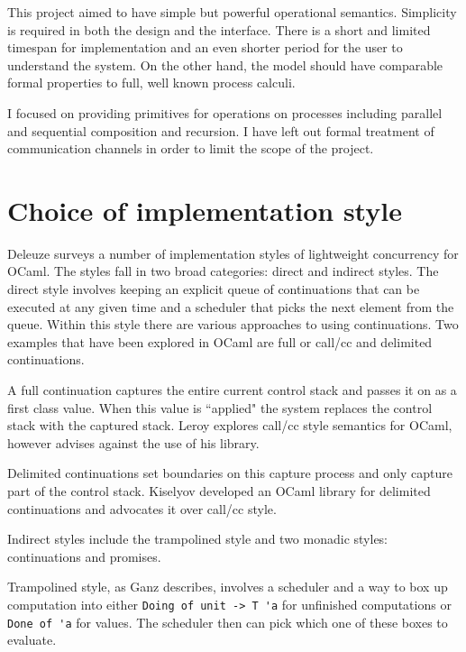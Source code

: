 \documentclass[12pt,twoside,notitlepage]{report}
\begin{document}

This project aimed to have simple but powerful operational semantics. Simplicity is required in both the design and the interface. There is a short and limited timespan for implementation and an even shorter period for the user to understand the system. On the other hand, the model should have comparable formal properties to full, well known process calculi. 

I focused on providing primitives for operations on processes including parallel and sequential composition and recursion. I have left out formal treatment of communication channels in order to limit the scope of the project.  


\section{Choice of implementation style}  
Deleuze\cite{deleuzelight} surveys a number of implementation styles of lightweight concurrency for OCaml. The styles fall in two broad categories: direct and indirect styles. The direct style involves keeping an explicit queue of continuations that can be executed at any given time and a scheduler that picks the next element from the queue.  Within this style there are various approaches to using continuations. Two examples that have been explored in OCaml are full or call/cc and delimited continuations. 

A full continuation captures the entire current control stack and passes it on as a first class value. When this value is ``applied" the system replaces the control stack with the captured stack. Leroy explores call/cc style semantics\cite{leroyocaml} for OCaml, however advises against the use of his library.

Delimited continuations set boundaries on this capture process and only capture part of the control stack. Kiselyov developed an OCaml library for delimited continuations\cite{kiselyov2010delimited, kiselyov2012delimited} and advocates it over call/cc style.

Indirect styles include the trampolined style and two monadic styles: continuations and promises. 

Trampolined style, as Ganz\cite{ganz1999trampolined} describes, involves a scheduler and a way to box up computation into either \lstinline|Doing of unit -> T 'a| for unfinished computations or \lstinline|Done of 'a| for values. The scheduler then can pick which one of these boxes to evaluate. 
\end{document}
